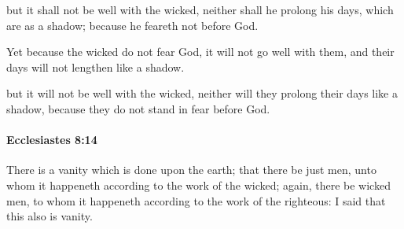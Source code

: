 			\begin{versebox}
					\item[BHS] 
					\item[LXX] 
					\item[ASV] but it shall not be well with the wicked, neither shall he prolong his days, which are as a shadow; because he feareth not before God.
					\item[NIV] Yet because the wicked do not fear God, it will not go well with them, and their days will not lengthen like a shadow.
					\item[NRSV] but it will not be well with the wicked, neither will they prolong their days like a shadow, because they do not stand in fear before God.
			\end{versebox}

		\paragraph{Ecclesiastes 8:14} %
			\label{ECCLESIASTES-8-14}

			There is a vanity which is done upon the earth; that there be just men, unto whom it happeneth according to the work of the wicked; again, there be wicked men, to whom it happeneth according to the work of the righteous: I said that this also is vanity.

